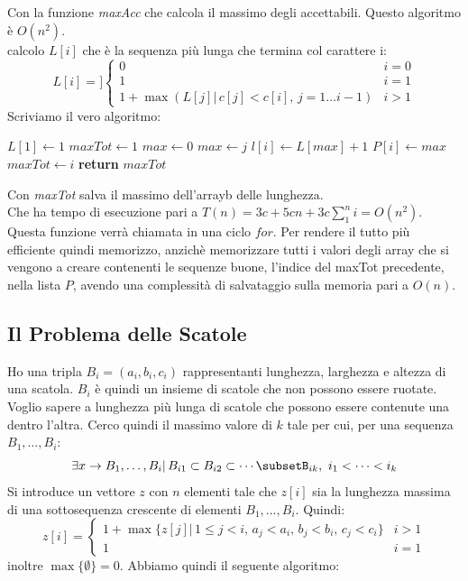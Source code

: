\documentclass[a4paper,12pt, oneside]{book}
\begin{document}
Con la funzione \textit{maxAcc} che calcola il massimo degli
accettabili. Questo algoritmo è $O(n^2)$.\\
calcolo $L[i]$ che è la sequenza più lunga che termina col carattere i:
\[
  L[i]=]\begin{cases}
    0 & i=0\\
    1 & i=1\\
    1+\max(L[j]|\, c[j]<c[i],\, j=1\ldots i-1)  & i>1 
  \end{cases}
\]
Scriviamo il vero algoritmo:
\begin{algorithm}
  \begin{algorithmic}
    \State $L[1]\gets1$
    \State $maxTot \gets 1$
    \State $max \gets 0$
    \State $max \gets j$
    \EndIf
    \State $l[i]\gets L[max]+1$
    \State $P[i]\gets max$ 
    \State $maxTot \gets i$
    \EndIf
    \EndFor
    \EndFor
    \State \textbf{return} $maxTot$
    \EndFunction
  \end{algorithmic}
\end{algorithm}
Con \textit{maxTot} salva il massimo dell'arrayb delle lunghezza.\\
Che ha tempo di esecuzione pari a $T(n)=3c+5cn+3c\sum_1^ni=O(n^2)$.\\
Questa funzione verrà chiamata in una ciclo $for$. Per rendere il
tutto più efficiente quindi memorizzo, anzichè memorizzare tutti i
valori degli array che si vengono a creare contenenti le sequenze
buone, l'indice del maxTot precedente, nella lista $P$, avendo una
complessità di salvataggio sulla memoria pari a $O(n)$.\\
\subsection{Il Problema delle Scatole}
Ho una tripla $B_i=(a_i,b_i,c_i)$ rappresentanti lunghezza, larghezza
e altezza di una scatola. $B_i$ è quindi un insieme di scatole che non
possono essere ruotate. Voglio sapere a lunghezza più lunga di scatole
che possono essere contenute una dentro l’altra. Cerco quindi il
massimo valore di $k$ tale per cui, per una sequenza $ B_1,\ldots,B_i$:
\[\exists x\to B_1,\ldots,B_i|\,B_{i1}\subset B_{i2}\subset\cdots
  \subsetB_{ik},\,\,i_1<\cdots<i_k\]
Si introduce un vettore $z$ con $n$ elementi tale che $z[i]$ sia la
lunghezza massima di una sottosequenza crescente di elementi $
B_1,\ldots,B_i$. Quindi:
\[
  z[i]=\begin{cases}
    1+\max\{z[j]|\, 1\leq j < i,\,a_j<a_i,\,b_j<b_i,\,c_j<c_i\} &
    i>1\\
    1 & i = 1
  \end{cases}
\]
inoltre $\max\{\emptyset\}=0$. Abbiamo quindi il seguente algoritmo:
\end{document}
